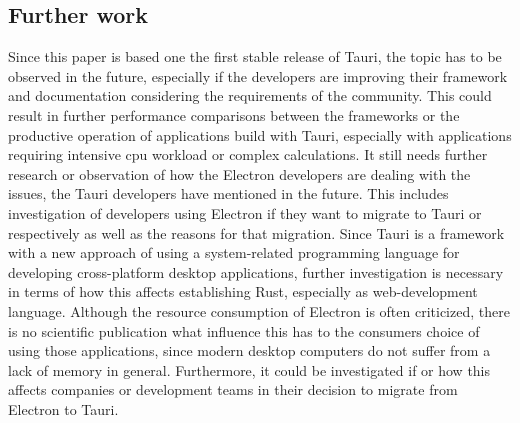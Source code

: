 \subsection{Further work}
Since this paper is based one the first stable release of Tauri, the topic has to be observed in the future, especially if the developers are improving their framework and documentation considering the requirements of the community.
This could result in further performance comparisons between the frameworks or the productive operation of applications build with Tauri, especially with applications requiring intensive cpu workload or complex calculations.
It still needs further research or observation of how the Electron developers are dealing with the issues, the Tauri developers have mentioned in the future.
This includes investigation of developers using Electron if they want to migrate to Tauri or respectively as well as the reasons for that migration.
Since Tauri is a framework with a new approach of using a system-related programming language for developing cross-platform desktop applications, further investigation is necessary in terms of how this affects establishing Rust, especially as web-development language.
Although the resource consumption of Electron is often criticized, there is no scientific publication what influence this has to the consumers choice of using those applications, since modern desktop computers do not suffer from a lack of memory in general.
Furthermore, it could be investigated if or how this affects companies or development teams in their decision to migrate from Electron to Tauri.



